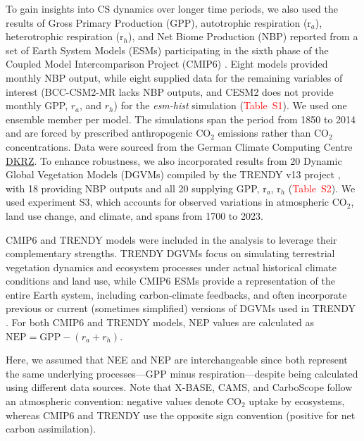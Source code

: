 \documentclass[ProofPDF]{./Styles/Jnls-Template-V3}
\begin{document}


To gain insights into CS dynamics over longer time periods, we also used the results of Gross Primary Production (GPP), autotrophic respiration (r$_a$), heterotrophic respiration (r$_h$), and Net Biome Production (NBP) reported from a set of Earth System Models (ESMs) participating in the sixth phase of the Coupled Model Intercomparison Project (CMIP6) \citep{Eyring2016}. Eight models provided monthly NBP output, while eight supplied data for the remaining variables of interest (BCC-CSM2-MR lacks NBP outputs, and CESM2 does not provide monthly GPP, $r_a$, and $r_h$) for the {\it esm-hist} simulation (\textcolor{red}{Table~S1}). We used one ensemble member per model. The simulations span the period from 1850 to 2014 and are forced by prescribed anthropogenic CO$_2$ emissions rather than CO$_2$ concentrations. Data were sourced from the German Climate Computing Centre \hyperlink{https://cmip-data-pool.dkrz.de/CMIP6-Data-Pool.html}{DKRZ}. To enhance robustness, we also incorporated results from 20 Dynamic Global Vegetation Models (DGVMs) compiled by the TRENDY v13 project \citep{Sitch2024}, with 18 providing NBP outputs and all 20 supplying GPP, r$_a$, r$_h$ (\textcolor{red}{Table~S2}). We used experiment S3, which accounts for observed variations in atmospheric CO$_2$, land use change, and climate, and spans from 1700 to 2023. 


CMIP6 and TRENDY models were included in the analysis to leverage their complementary strengths. TRENDY DGVMs focus on simulating terrestrial vegetation dynamics and ecosystem processes under actual historical climate conditions and land use, while CMIP6 ESMs provide a representation of the entire Earth system, including carbon-climate feedbacks, and often incorporate previous or current (sometimes simplified) versions of DGVMs used in TRENDY \citep{Argles2022,Weng2022}. For both CMIP6 and TRENDY models, NEP values are calculated as $\mathrm{NEP}=\mathrm{GPP}-(r_a+r_h)$.

Here, we assumed that NEE and NEP are interchangeable since both represent the same underlying processes—GPP minus respiration—despite being calculated using different data sources. Note that X-BASE, CAMS, and CarboScope follow an atmospheric convention: negative values denote CO$_2$ uptake by ecosystems, whereas CMIP6 and TRENDY use the opposite sign convention (positive for net carbon assimilation).
\end{document}
